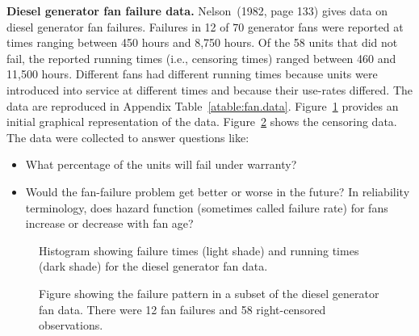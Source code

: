 \begin{example}
\label{example:fan.data}
{\bf Diesel generator fan failure data.} Nelson~(1982, page 133) gives
data on diesel generator fan failures.  Failures in 12 of $70$
generator fans were reported at times ranging between 450 hours and
8,750 hours. Of the 58 units that did not fail, the reported running
times (i.e., censoring times) ranged between 460 and 11,500 hours.
Different fans had different running times because units were
introduced into service at different times and because 
their use-rates differed. The data are reproduced in Appendix
Table~\ref{atable:fan.data}.  Figure~\ref{figure:fan.histogram.ps}
provides an initial graphical representation of the data.  
Figure~\ref{figure:fan.censorfig.ps} shows the censoring data. 
The data
were collected to answer questions like:
\begin{itemize} 
\item 
What percentage of the units will fail
under warranty?
\item
Would the fan-failure problem get better or worse in the future? In
reliability terminology, does hazard function (sometimes called
failure rate) for fans increase or decrease with fan age?
\end{itemize}
\begin{figure}
\caption{Histogram showing failure times (light shade)
and running times (dark shade)
for the diesel generator fan data.}
\label{figure:fan.histogram.ps}
\end{figure}
\begin{figure}
\caption{Figure showing the failure pattern in 
a subset of the diesel generator
fan data. There were 12 fan failures and 58
right-censored
observations.}
\label{figure:fan.censorfig.ps}
\end{figure}
\end{example}


